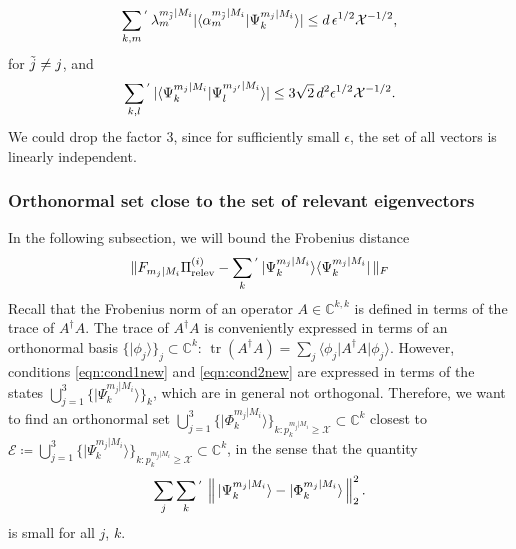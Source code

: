 \begin{equation*}
\sum_{k,m}{}^{'}\thinspace\lambda_m^{m_{\Tilde{j}}\vert M_i}\vert \langle \alpha_m^{m_{\Tilde{j}}\vert M_i}\vert \Psi_k^{m_j\vert M_i}\rangle \vert \leq d\thinspace \epsilon^{1/2}\mathcal{X}^{-1/2},
\end{equation*}
for $\Tilde{j}\neq j$, and
\begin{equation}
\label{eqn:overlapbound}
\sum_{k,l}{}^{'}\thinspace\vert\langle \Psi_k^{m_j\vert M_i} \vert \Psi_l^{m_{j'}\vert M_i}\rangle \vert \leq 3\sqrt{2}\thinspace d^2 \epsilon^{1/2}\mathcal{X}^{-1/2}.
\end{equation}
We could drop the factor $3$, since for sufficiently small $\epsilon$, the set of all vectors is linearly independent.
\subsubsection{Orthonormal set close to the set of relevant eigenvectors}
In the following subsection, we will bound the Frobenius distance
\begin{equation*}
\|F_{m_j\vert M_i}\Pi_{\text{relev}}^{(i)}-\sum_{k}{}^{'}\thinspace\vert \Psi_k^{m_j\vert M_i}\rangle \langle \Psi_k^{m_j\vert M_i}\vert \thinspace\|_F
\end{equation*}
Recall that the Frobenius norm of an operator $A\in\mathbb{C}^{k,k}$ is defined in terms of the trace of $A^{\dag}A$. The trace of $A^{\dag}A$ is conveniently expressed in terms of an orthonormal basis $\{\vert \phi_j \rangle\}_j\subset \mathbb{C}^k$: $\operatorname{tr}(A^{\dag}A)=\sum_j \langle \phi_j \vert A^{\dag}A \vert \phi_j \rangle$. However, conditions \ref{eqn:cond1new} and \ref{eqn:cond2new} are expressed in terms of the states $\bigcup\limits_{j=1}^3\{\vert \Psi_k^{m_j\vert M_i} \rangle\}_k$, which are in general not orthogonal. Therefore, we want to find an orthonormal set $\bigcup\limits_{j=1}^3\{\vert \Phi_k^{m_j\vert M_i}\rangle\}_{k:p_k^{m_j\vert M_i}\geq \mathcal{X}}\subset\mathbb{C}^k$ closest to $\mathcal{E}\coloneqq\bigcup\limits_{j=1}^3\{\vert \Psi_k^{m_j\vert M_i}\rangle\}_{k:p_k^{m_j\vert M_i}\geq \mathcal{X}}\subset\mathbb{C}^k$, in the sense that the quantity
\begin{equation*}
\sum_{j}\sum_{k}{}^{'}\thinspace\left\|\thinspace\vert \Psi_k^{m_j\vert M_i} \rangle - \vert \Phi_k^{m_j\vert M_i} \rangle \thinspace \right\|_2^2.
\end{equation*}
is small for all $j$, $k$.

